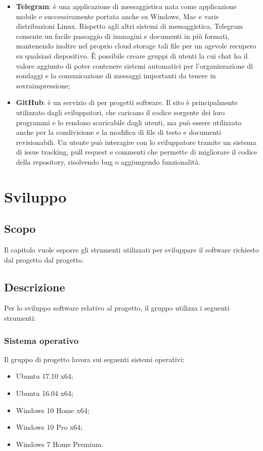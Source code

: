 \documentclass[openany,12pt,a4paper]{report}
\begin{document}
	\begin{itemize}
	    \item \textbf{Telegram}:  è una applicazione di messaggistica nata come applicazione mobile e successivamente portata anche su Windows, Mac e varie distribuzioni Linux. Rispetto agli altri sistemi di messaggistica, Telegram consente un facile passaggio di immagini e documenti in più formati, mantenendo inoltre nel proprio cloud storage tali file per un agevole recupero su qualsiasi dispositivo. È possibile creare gruppi di utenti la cui chat ha il valore aggiunto di poter contenere sistemi automatici per l'organizzazione di sondaggi e la comunicazione di messaggi importanti da tenere in sovraimpressione;
	    
	    \item \textbf{GitHub}:  è un servizio di  per progetti software. Il sito è principalmente utilizzato dagli sviluppatori, che caricano il codice sorgente dei loro programmi e lo rendono scaricabile dagli utenti, ma può essere utilizzato anche per la condivisione e la modifica di file di testo e documenti revisionabili. Un utente può interagire con lo sviluppatore tramite un sistema di issue tracking, pull request e commenti che permette di migliorare il codice della repository, risolvendo bug o aggiungendo funzionalità.
	\end{itemize}


\chapter{Sviluppo}

\section{Scopo}
Il capitolo vuole esporre gli strumenti utilizzati per sviluppare il software richiesto dal progetto dal progetto. 
\section{Descrizione}
Per lo sviluppo software relativo al progetto, il gruppo utilizza i seguenti strumenti:

\subsection{Sistema operativo}
Il gruppo di progetto lavora sui seguenti sistemi operativi:
\begin{itemize}
	\item Ubuntu 17.10 x64;
	\item Ubuntu 16.04  x64;
	\item Windows 10 Home x64;
	\item Windows 10 Pro x64;
	\item Windows 7 Home Premium.
\end{itemize}
\end{document}
